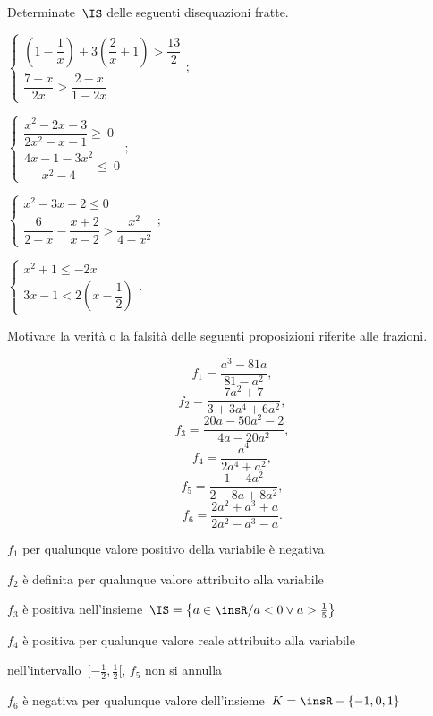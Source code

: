 \begin{esercizio}[\Ast]
\label{ese:21.68}
Determinate~\(\IS\) delle seguenti disequazioni fratte.
\begin{multicols}{2}
\begin{enumeratea}{\longarray
 \item \(\left\{\begin{array}{l}
  \left(1-\dfrac{1}{x}\right)+3\left(\dfrac{2}{x}+1\right)>\dfrac{13}{2}\\
  \dfrac{7+x}{2x}>\dfrac{2-x}{1-2x}
   \end{array}\right.;\)
\item \(\left\{\begin{array}{l}
  \dfrac{x^{2}-2x-3}{2x^{2}-x-1}\ge~0\\
  \dfrac{4x-1-3x^{2}}{x^{2}-4}\le~0
        \end{array}\right.;\)
\item \(\left\{\begin{array}{l}
  x^{2}-3x+2\le0\\
  \dfrac{6}{2+x}-\dfrac{x+2}{x-2}>\dfrac{x^{2}}{4-x^{2}}
        \end{array}\right.;\)
\item \(\left\{\begin{array}{l}
  x^{2}+1\le -2x\\
  3x-1<2\left(x-\dfrac{1}{2}\right)
  \end{array}\right..\)}
\end{enumeratea}
\end{multicols}
\end{esercizio}

\begin{esercizio}
\label{ese:21.69}
Motivare la verità o la falsità delle seguenti
proposizioni riferite alle frazioni.
\begin{multicols}{3}
\noindent\[f_{1}=\frac{a^{3}-81a}{81-a^{2}},\]
\[f_{2}=\frac{7a^{2}+7}{3+3a^{4}+6a^{2}},\]
\[f_{3}=\frac{20a-50a^{2}-2}{4a-20a^{2}},\]
\[f_{4}=\frac{a^{4}}{2a^{4}+a^{2}},\]
\[f_{5}=\frac{1-4a^{2}}{2-8a+8a^{2}},\]
\[f_{6}=\frac{2a^{2}+a^{3}+a}{2a^{2}-a^{3}-a}.\]
\end{multicols}
\begin{enumeratea}
\TabPositions{11cm}
\item \(f_{1}\) per qualunque valore positivo della variabile è negativa \tab\boxV\quad\boxF
\item \(f_{2}\) è definita per qualunque valore attribuito alla variabile \tab\boxV\quad\boxF
\item \(f_{3}\) è positiva nell'insieme~\(\IS=\left\{a\in \insR/a<0\vee a>\frac{1}{5}\right\}\) \tab\boxV\quad\boxF
\item \(f_{4}\) è positiva per qualunque valore reale attribuito alla variabile \tab\boxV\quad\boxF
\item nell'intervallo~\({[}-\frac{1}{2},\frac{1}{2}{[}\), \(f_{5}\) non si annulla \tab\boxV\quad\boxF
\item \(f_{6}\) è negativa per qualunque valore dell'insieme~\(K=\insR-\{-1,0,1\}\) \tab\boxV\quad\boxF
\end{enumeratea}
\end{esercizio}

